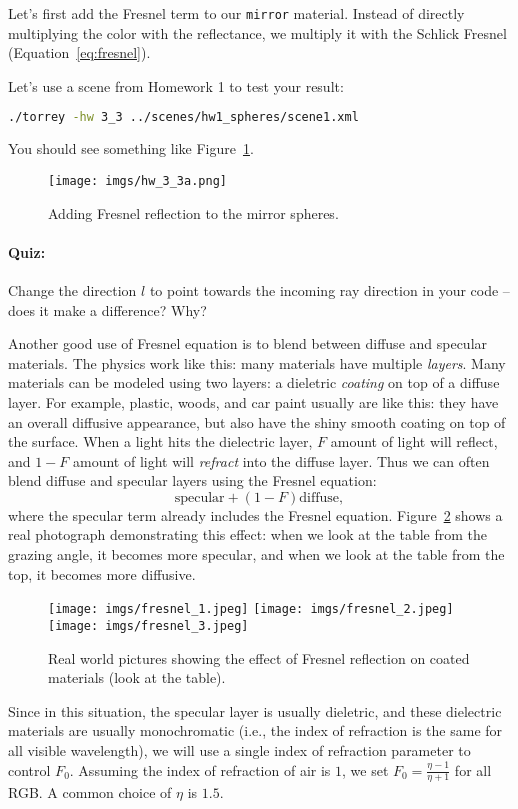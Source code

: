 Let's first add the Fresnel term to our \lstinline{mirror} material. Instead of directly multiplying the color with the reflectance, we multiply it with the Schlick Fresnel (Equation~\eqref{eq:fresnel}). 

Let's use a scene from Homework 1 to test your result:
\begin{lstlisting}[language=bash]
./torrey -hw 3_3 ../scenes/hw1_spheres/scene1.xml
\end{lstlisting}

You should see something like Figure~\ref{fig:hw_3_3_fresnel}.

\begin{figure}[ht]
    \centering
    \texttt{[image: imgs/hw\_3\_3a.png]}
    \caption{Adding Fresnel reflection to the mirror spheres.}
    \label{fig:hw_3_3_fresnel}
\end{figure}

\paragraph{Quiz:} Change the direction $l$ to point towards the incoming ray direction in your code -- does it make a difference? Why?

Another good use of Fresnel equation is to blend between diffuse and specular materials. The physics work like this: many materials have multiple \emph{layers}. Many materials can be modeled using two layers: a dieletric \emph{coating} on top of a diffuse layer. For example, plastic, woods, and car paint usually are like this: they have an overall diffusive appearance, but also have the shiny smooth coating on top of the surface. When a light hits the dielectric layer, $F$ amount of light will reflect, and $1 - F$ amount of light will \emph{refract} into the diffuse layer. Thus we can often blend diffuse and specular layers using the Fresnel equation:
\begin{equation}
\text{specular} + (1 - F) \text{diffuse},
\end{equation}
where the specular term already includes the Fresnel equation. Figure~\ref{fig:real_world_fresnel} shows a real photograph demonstrating this effect: when we look at the table from the grazing angle, it becomes more specular, and when we look at the table from the top, it becomes more diffusive.
\begin{figure}[ht]
    \centering
    \texttt{[image: imgs/fresnel\_1.jpeg]}
    \texttt{[image: imgs/fresnel\_2.jpeg]}
    \texttt{[image: imgs/fresnel\_3.jpeg]}
    \caption{Real world pictures showing the effect of Fresnel reflection on coated materials (look at the table).}
    \label{fig:real_world_fresnel}
\end{figure}
Since in this situation, the specular layer is usually dieletric, and these dielectric materials are usually monochromatic (i.e., the index of refraction is the same for all visible wavelength), we will use a single index of refraction parameter to control $F_0$. Assuming the index of refraction of air is $1$, we set $F_0 = \frac{\eta - 1}{\eta + 1}$ for all RGB. A common choice of $\eta$ is $1.5$.

